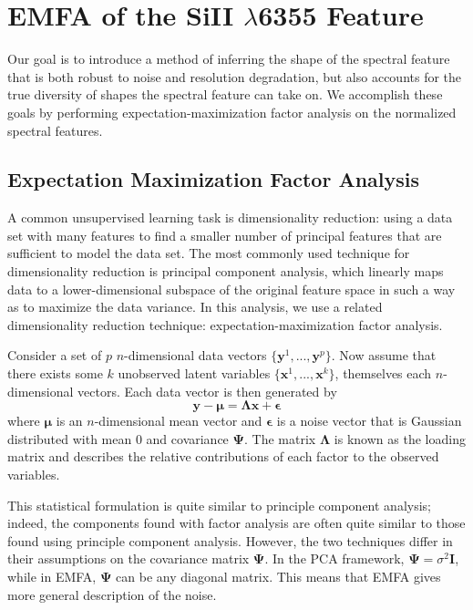 \section{EMFA of the SiII \texorpdfstring{$\lambda$}{}6355 Feature}
\label{method}
Our goal is to introduce a method of inferring the shape of the spectral feature that is both robust to noise and resolution degradation, but also accounts for the true diversity of shapes the spectral feature can take on. We accomplish these goals by performing expectation-maximization factor analysis on the normalized spectral features.

\subsection{Expectation Maximization Factor Analysis}
A common unsupervised learning task is dimensionality reduction: using a data set with many features to find a smaller number of principal features that are sufficient to model the data set. The most commonly used technique for dimensionality reduction is principal component analysis, which linearly maps data to a lower-dimensional subspace of the original feature space in such a way as to maximize the data variance. In this analysis, we use a related dimensionality reduction technique: expectation-maximization factor analysis.

Consider a set of $p$ $n$-dimensional data vectors $\{\bm{y}^1, ..., \bm{y}^p\}$. Now assume that there exists some $k$ unobserved latent variables $\{\bm{x}^1, ..., \bm{x}^k\}$, themselves each $n$-dimensional vectors. Each data vector is then generated by
\begin{equation}
\bm{y} - \bm{\mu} = \bm{\Lambda}\bm{x}+\bm{\epsilon}
\end{equation}
where $\bm{\mu}$ is an $n$-dimensional mean vector and $\bm{\epsilon}$ is a noise vector that is Gaussian distributed with mean 0 and covariance $\bm{\Psi}$. The matrix $\bm{\Lambda}$ is known as the loading matrix and describes the relative contributions of each factor to the observed variables.

This statistical formulation is quite similar to principle component analysis; indeed, the components found with factor analysis are often quite similar to those found using principle component analysis. However, the two techniques differ in their assumptions on the covariance matrix $\bm{\Psi}$. In the PCA framework, $\bm{\Psi}=\sigma^2\bm{I}$, while in EMFA, $\bm{\Psi}$ can be any diagonal matrix. This means that EMFA gives more general description of the noise.

